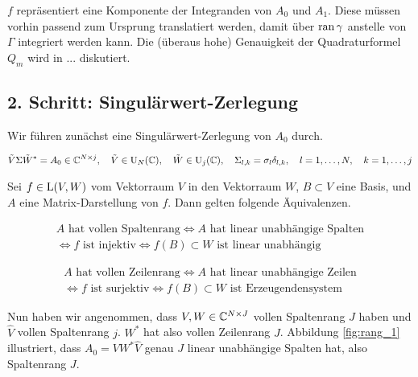 $f$ repräsentiert eine Komponente der Integranden von $A_0$ und $A_1$.
Diese müssen vorhin passend zum Ursprung translatiert werden, damit über $\operatorname{ran} \gamma$ anstelle von $\Gamma$ integriert werden kann.
Die (überaus hohe) Genauigkeit der Quadraturformel $Q_m$ wird in ... diskutiert.

\subsection*{2. Schritt: Singulärwert-Zerlegung}

Wir führen zunächst eine Singulärwert-Zerlegung von $A_0$ durch.

\begin{align*}
    \tilde V \Sigma \tilde W^\ast = A_0 \in \mathbb{C}^{N \times j},
    \quad
    \tilde V \in \operatorname{U}_N(\mathbb{C}),
    \quad
    \tilde W \in \operatorname{U}_j(\mathbb{C}),
    \quad
    \Sigma_{l, k} = \sigma_l \delta_{l, k},
    \quad
    l = 1, \dots, N,
    \quad
    k = 1, \dots, j
\end{align*}

\begin{remark}

    Sei $f \in \operatorname{L}(V, W)$ vom Vektorraum $V$ in den Vektorraum $W$, $B \subset V$ eine Basis, und $A$ eine Matrix-Darstellung von $f$.
    Dann gelten folgende Äquivalenzen.

    \begin{multline*}
        \text{$A$ hat vollen Spaltenrang}
        \iff
        \text{$A$ hat linear unabhängige Spalten} \\
        \iff
        \text{$f$ ist injektiv}
        \iff
        \text{$f(B) \subset W$ ist linear unabhängig}
    \end{multline*}

    \begin{multline*}
        \text{$A$ hat vollen Zeilenrang}
        \iff
        \text{$A$ hat linear unabhängige Zeilen} \\
        \iff
        \text{$f$ ist surjektiv}
        \iff
        \text{$f(B) \subset W$ ist Erzeugendensystem}
    \end{multline*}

\end{remark}


Nun haben wir angenommen, dass $V, W \in \mathbb{C}^{N \times J}$ vollen Spaltenrang $J$ haben und $\hat V$ vollen Spaltenrang $j$.
$W^\ast$ hat also vollen Zeilenrang $J$.
Abbildung \ref{fig:rang_1} illustriert, dass $A_0 = V W^\ast \hat V$ genau $J$ linear unabhängige Spalten hat, also Spaltenrang $J$.

